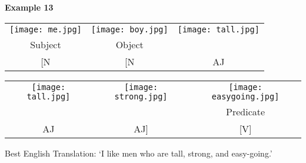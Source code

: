 \documentclass{tufte-book}
\begin{document}
\newpage
\noindent \textbf{Example 13}
\begin{table*}[h!]
\begin{tabular}{c|  c c}
\texttt{[image: me.jpg]}&\texttt{[image: boy.jpg]}&\texttt{[image: tall.jpg]}\\
\footnotesize Subject &  \footnotesize Object & \\
\footnotesize [N & \footnotesize [N & \footnotesize AJ\\

\end{tabular}
\end{table*}
\begin{table*}[h!]
\begin{tabular}{c  c |c}
\texttt{[image: tall.jpg]}&\texttt{[image: strong.jpg]}&\texttt{[image: easygoing.jpg]}\\
  & & \footnotesize Predicate \\
\footnotesize AJ & \footnotesize AJ] & \footnotesize [V]\\

\end{tabular}
\end{table*}

\begin{fullwidth}

Best English Translation: `I like men who are tall, strong, and easy-going.'
\end{fullwidth}
\end{document}
